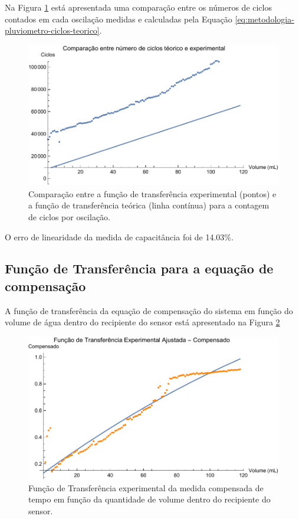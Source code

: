\documentclass[a4paper]{instrumentacao}
\begin{document}
Na Figura \ref{fig:resultados-pluviometro-ciclos-comparacao} está apresentada uma comparação entre os números de ciclos contados em cada oscilação medidas e calculadas pela Equação \ref{eq:metodologia-pluviometro-ciclos-teorico}.

\begin{figure}[H]
	\centering \includegraphics[width=\textwidth]{Nivel/Experimental/Ciclos-Comparacao.pdf}
	\caption{Comparação entre a função de transferência experimental (pontos) e a função de transferência teórica (linha contínua) para a contagem de ciclos por oscilação.}
	\label{fig:resultados-pluviometro-ciclos-comparacao}
\end{figure}

O erro de linearidade da medida de capacitância foi de 14.03\%.

\subsection{Função de Transferência para a equação de compensação}

A função de transferência da equação de compensação do sistema em função do volume de água dentro do recipiente do sensor está apresentado na Figura \ref{fig:resultados-pluviometro-tf-compensado}

\begin{figure}[H]
	\centering \includegraphics[width=\textwidth]{Nivel/Experimental/Compensado-Ajuste.pdf}
	\caption{Função de Transferência experimental da medida compensada de tempo em função da quantidade de volume dentro do recipiente do sensor.}
	\label{fig:resultados-pluviometro-tf-compensado}
\end{figure}
\end{document}
